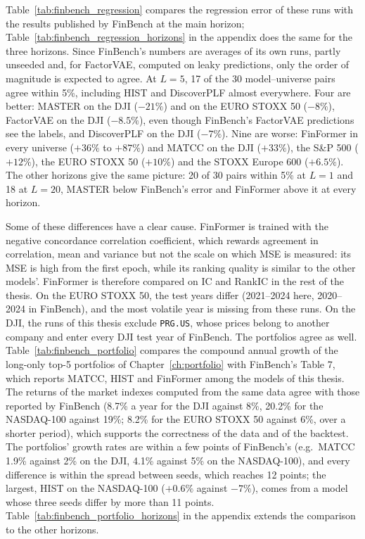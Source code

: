 Table~\ref{tab:finbench_regression} compares the regression error of these runs with the results published by FinBench at the main horizon; Table~\ref{tab:finbench_regression_horizons} in the appendix does the same for the three horizons. Since FinBench's numbers are averages of its own runs, partly unseeded and, for FactorVAE, computed on leaky predictions, only the order of magnitude is expected to agree. At $L = 5$, 17 of the 30 model--universe pairs agree within 5\%, including HIST and DiscoverPLF almost everywhere. Four are better: MASTER on the DJI ($-21\%$) and on the EURO STOXX 50 ($-8\%$), FactorVAE on the DJI ($-8.5\%$), even though FinBench's FactorVAE predictions see the labels, and DiscoverPLF on the DJI ($-7\%$). Nine are worse: FinFormer in every universe ($+36\%$ to $+87\%$) and MATCC on the DJI ($+33\%$), the S\&P 500 ($+12\%$), the EURO STOXX 50 ($+10\%$) and the STOXX Europe 600 ($+6.5\%$). The other horizons give the same picture: 20 of 30 pairs within 5\% at $L = 1$ and 18 at $L = 20$, MASTER below FinBench's error and FinFormer above it at every horizon.



Some of these differences have a clear cause. FinFormer is trained with the negative concordance correlation coefficient, which rewards agreement in correlation, mean and variance but not the scale on which MSE is measured: its MSE is high from the first epoch, while its ranking quality is similar to the other models'. FinFormer is therefore compared on IC and RankIC in the rest of the thesis. On the EURO STOXX 50, the test years differ (2021--2024 here, 2020--2024 in FinBench), and the most volatile year is missing from these runs. On the DJI, the runs of this thesis exclude \texttt{PRG.US}, whose prices belong to another company and enter every DJI test year of FinBench. %
The portfolios agree as well. Table~\ref{tab:finbench_portfolio} compares the compound annual growth of the long-only top-5 portfolios of Chapter~\ref{ch:portfolio} with FinBench's Table 7, which reports MATCC, HIST and FinFormer among the models of this thesis. The returns of the market indexes computed from the same data agree with those reported by FinBench (8.7\% a year for the DJI against 8\%, 20.2\% for the NASDAQ-100 against 19\%; 8.2\% for the EURO STOXX 50 against 6\%, over a shorter period), which supports the correctness of the data and of the backtest. The portfolios' growth rates are within a few points of FinBench's (e.g.\ MATCC 1.9\% against 2\% on the DJI, 4.1\% against 5\% on the NASDAQ-100), and every difference is within the spread between seeds, which reaches 12 points; the largest, HIST on the NASDAQ-100 ($+0.6\%$ against $-7\%$), comes from a model whose three seeds differ by more than 11 points. Table~\ref{tab:finbench_portfolio_horizons} in the appendix extends the comparison to the other horizons.

